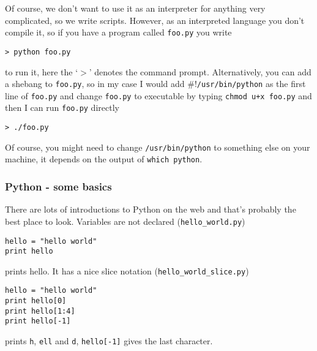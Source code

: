 \documentclass[12pt]{article}
\begin{document}
Of course, we don't want to use it as an interpreter for anything very
complicated, so we write scripts. However, as an interpreted language
you don't compile it, so if you have a program called \texttt{foo.py}
you write
\begin{lstlisting}[numbers=right]
> python foo.py
\end{lstlisting}
to run it, here the \lq{}$>$\rq{} denotes the command
prompt. Alternatively, you can add a shebang to \texttt{foo.py}, so in
my case I would add \texttt{$\#!$/usr/bin/python} as the first line of
\texttt{foo.py} and change \texttt{foo.py} to executable by typing
\texttt{chmod u+x foo.py} and then I can run \texttt{foo.py} directly
\begin{lstlisting}[numbers=right]
> ./foo.py
\end{lstlisting}
Of course, you might need to change \texttt{/usr/bin/python} to
something else on your machine, it depends on the output of
\texttt{which python}.

\subsubsection*{Python - some basics}
There are lots of introductions to Python on the web and that's
probably the best place to look. Variables are not declared (\texttt{hello\_world.py})
\begin{lstlisting}[numbers=right]
hello = "hello world"
print hello
\end{lstlisting}
prints hello. It has a nice slice notation  (\texttt{hello\_world\_slice.py})
\begin{lstlisting}[numbers=right]
hello = "hello world"
print hello[0]
print hello[1:4]
print hello[-1]
\end{lstlisting}
prints \texttt{h}, \texttt{ell} and \texttt{d}, \texttt{hello[-1]}
gives the last character. 
\end{document}

